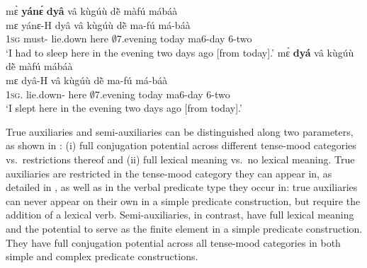 \ea \label{G114}
  \ea \label{G114a}
  \glll  mɛ̀ {\bfseries yánɛ́} {\bfseries dyâ} vâ kùgúù dẽ̀ màfú mábáà \\
     mɛ yánɛ-H dyâ vâ kùgúù dẽ̀ ma-fú má-báà \\
          1\textsc{sg} must-{\R} lie.down here $\emptyset$7.evening today ma6-day 6-two  \\
    \trans `I had to sleep here in the evening two days ago [from today].'
\ex\label{G114b} 
  \glll  mɛ̀ {\bfseries dyá} vâ kùgúù dẽ̀ màfú mábáà \\
     mɛ  dyâ-H vâ kùgúù dẽ̀ ma-fú má-báà \\
          1\textsc{sg}.{\PST} lie.down-{\R} here $\emptyset$7.evening today ma6-day 6-two  \\
    \trans `I slept here in the evening two days ago [from today].'
\z
\z

True auxiliaries and semi-auxiliaries can be distinguished along two parameters, as shown in : (i) full conjugation potential across different tense-mood categories vs.\ restrictions thereof and (ii) full lexical meaning vs.\ no lexical meaning. True auxiliaries are restricted in the tense-mood category they can appear in, as detailed in , as well as in the verbal predicate type they occur in: true auxiliaries can never appear on their own in a simple predicate construction, but require the addition of a lexical verb. Semi-auxiliaries, in contrast, have full lexical meaning and the potential to serve as the finite element in a simple predicate construction. They have full conjugation potential across all tense-mood categories in both simple and complex predicate constructions.


